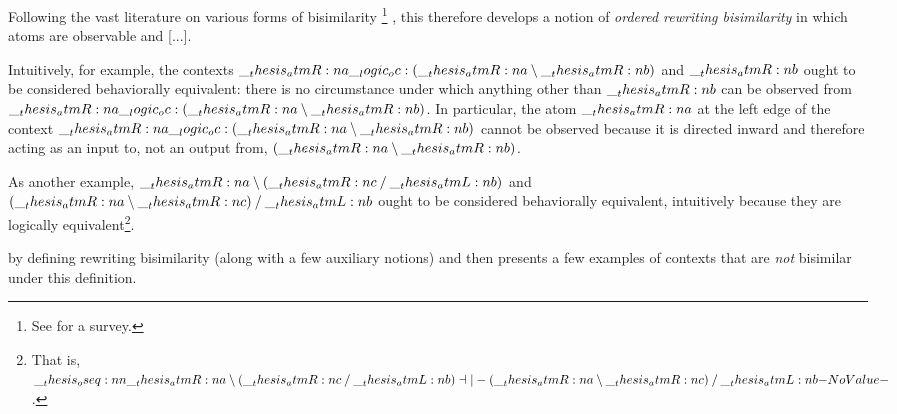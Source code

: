 Following the vast literature on various forms of bisimilarity%
\footnote{See \textcite{??} for a survey.}%
, this  therefore develops a notion of \emph{ordered rewriting bisimilarity} in which atoms are observable and [...].

Intuitively, for example, the contexts $\__thesis_atmR:n {a} \__logic_oc: (\__thesis_atmR:n {a} \mathbin { \setminus } \__thesis_atmR:n {b})$ and $\__thesis_atmR:n {b}$ ought to be considered behaviorally equivalent: there is no circumstance under which anything other than $\__thesis_atmR:n {b}$ can be observed from $\__thesis_atmR:n {a} \__logic_oc: (\__thesis_atmR:n {a} \mathbin { \setminus } \__thesis_atmR:n {b})$.
In particular, the atom $\__thesis_atmR:n {a}$ at the left edge of the context $\__thesis_atmR:n {a} \__logic_oc: (\__thesis_atmR:n {a} \mathbin { \setminus } \__thesis_atmR:n {b})$ cannot be observed because it is directed inward and therefore acting as an input to, not an output from, $(\__thesis_atmR:n {a} \mathbin { \setminus } \__thesis_atmR:n {b})$.

As another example, $\__thesis_atmR:n {a} \mathbin { \setminus } (\__thesis_atmR:n {c} \mathbin { / } \__thesis_atmL:n {b})$ and $(\__thesis_atmR:n {a} \mathbin { \setminus } \__thesis_atmR:n {c}) \mathbin { / } \__thesis_atmL:n {b}$ ought to be considered behaviorally equivalent, intuitively because they are logically equivalent\footnote{That is, $\oseq{\atmR{a} \limp (\atmR{c} \pmir \atmL{b}) \dashv|- (\atmR{a} \limp \atmR{c}) \pmir \atmL{b}}$.}.




 by defining rewriting bisimilarity (along with a few auxiliary notions) and then presents a few examples of contexts that are \emph{not} bisimilar under this definition.

